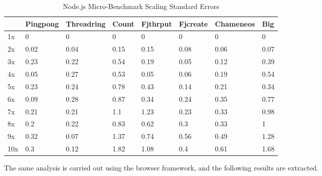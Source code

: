 \documentclass[oneside]{um-fict}
\begin{document}
\begin{table}[H]
    \begin{center}
        \begin{tabular}{|l|lllllll|}
        \hline
        & Pingpong & Threadring & Count & Fjthrput & Fjcreate & Chameneos & Big  \\ \hline
        1x  & 0        & 0          & 0     & 0        & 0        & 0    & 0    \\
        2x  & 0.02     & 0.04       & 0.15  & 0.15     & 0.08     & 0.06 & 0.07 \\
        3x  & 0.23     & 0.22       & 0.54  & 0.19     & 0.05     & 0.12 & 0.39 \\
        4x  & 0.05     & 0.27       & 0.53  & 0.05     & 0.06     & 0.19 & 0.54 \\
        5x  & 0.23     & 0.24       & 0.78  & 0.43     & 0.14     & 0.21 & 0.34 \\
        6x  & 0.09     & 0.28       & 0.87  & 0.34     & 0.24     & 0.35 & 0.77 \\
        7x  & 0.21     & 0.21       & 1.1   & 1.23     & 0.23     & 0.33 & 0.98 \\
        8x  & 0.2      & 0.22       & 0.83  & 0.62     & 0.3      & 0.33 & 1    \\
        9x  & 0.32     & 0.07       & 1.37  & 0.74     & 0.56     & 0.49 & 1.28 \\
        10x & 0.3      & 0.12       & 1.82  & 1.08     & 0.4      & 0.61 & 1.68 \\ \hline
        \end{tabular}
        \caption{Node.js Micro-Benchmark Scaling Standard Errors}\label{tab:nodeloadscalingsem}
    \end{center}
\end{table}

The same analysis is carried out using the browser framework, and the following results are extracted.
\end{document}
